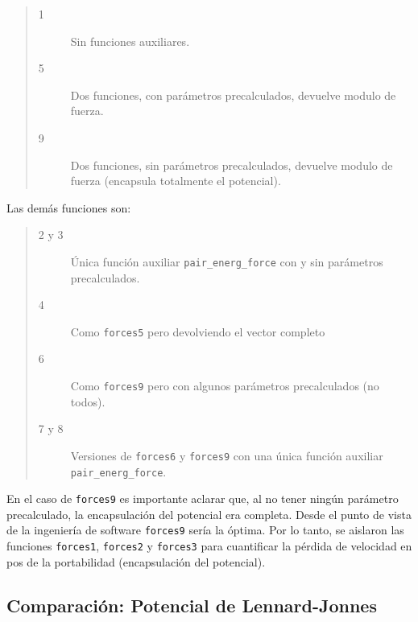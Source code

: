 \documentclass[twoside, 12pt]{article}
\begin{document}
\begin{quote}
\begin{description}
\item[1] Sin funciones auxiliares.
\item[5] Dos funciones, con parámetros precalculados, devuelve modulo de fuerza.
\item[9] Dos funciones, sin parámetros precalculados, devuelve modulo de fuerza (encapsula totalmente el potencial).
\end{description}
\end{quote}

Las demás funciones son:

\begin{quote}
\begin{description}
\item[2 y 3] Única función auxiliar \texttt{pair\_energ\_force} con y sin parámetros precalculados.
\item[4] Como \texttt{forces5} pero devolviendo el vector completo
\item[6] Como \texttt{forces9} pero con algunos parámetros precalculados (no todos).
\item[7 y 8] Versiones de \texttt{forces6} y \texttt{forces9} con una única función auxiliar \texttt{pair\_energ\_force}.
\end{description}
\end{quote}

En el caso de \texttt{forces9} es importante aclarar que, al no tener ningún parámetro precalculado, la encapsulación del potencial era completa. Desde el punto de vista de la ingeniería de software \texttt{forces9} sería la óptima. Por lo tanto, se aislaron las funciones \texttt{forces1}, \texttt{forces2} y \texttt{forces3} para cuantificar la pérdida de velocidad en pos de la portabilidad (encapsulación del potencial).

\subsection{Comparación: Potencial de Lennard-Jonnes}

	
\end{document}
